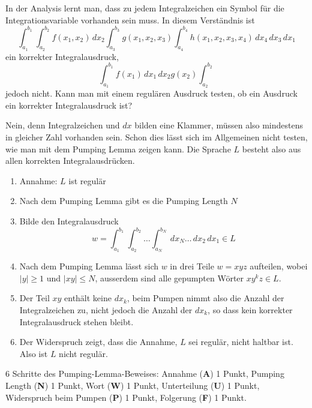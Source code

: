 In der Analysis lernt man, dass zu jedem Integralzeichen ein 
Symbol für die Integrationsvariable vorhanden sein muss.
In diesem Verständnis ist
\[
\int_{a_1}^{b_1}
\int_{a_2}^{b_2}
f(x_1,x_2)
\,dx_2
\int_{a_3}^{b_3}
g(x_1,x_2,x_3)
\int_{a_4}^{b_4}
h(x_1,x_2,x_3,x_4)
\,dx_4
\,dx_3
\,dx_1
\]
ein korrekter Integralausdruck,
\[
\int_{a_1}^{b_1}
f(x_1)\,dx_1\,dx_2 g(x_2)
\int_{a_2}^{b_2}
\]
jedoch nicht.
Kann man mit einem regulären Ausdruck testen, ob ein Ausdruck ein korrekter
Integralausdruck ist?

\begin{loesung}
Nein, denn Integralzeichen und $dx$ bilden eine Klammer, müssen also 
mindestens in gleicher Zahl vorhanden sein.
Schon dies lässt sich im Allgemeinen nicht testen, wie man mit dem 
Pumping Lemma zeigen kann.
Die Sprache $L$ besteht also aus allen korrekten Integralausdrücken.
\begin{enumerate}
\item
Annahme: $L$ ist regulär
\item
Nach dem Pumping Lemma gibt es die Pumping Length $N$
\item
Bilde den Integralausdruck
\[
w=
\int_{a_1}^{b_1}
\int_{a_2}^{b_2}
\dots
\int_{a_N}^{b_N}
\,dx_N
\dots
\,dx_2
\,dx_1
\in L
\]
\item
Nach dem Pumping Lemma lässt sich $w$ in drei Teile $w=xyz$ aufteilen, wobei
$|y|\ge 1$ und $|xy|\le N$, ausserdem sind alle gepumpten Wörter $xy^kz\in L$.
\item
Der Teil $xy$ enthält keine $dx_k$, beim Pumpen nimmt also die Anzahl
der Integralzeichen zu, nicht jedoch die Anzahl der $dx_k$, so dass
kein korrekter Integralausdruck stehen bleibt.
\item
Der Widerspruch zeigt, dass die Annahme, $L$ sei regulär, nicht haltbar ist.
Also ist $L$ nicht regulär.
\qedhere
\end{enumerate}
\end{loesung}

\begin{bewertung}
6 Schritte des Pumping-Lemma-Beweises:
Annahme ({\bf A}) 1 Punkt,
Pumping Length ({\bf N}) 1 Punkt,
Wort ({\bf W}) 1 Punkt,
Unterteilung ({\bf U}) 1 Punkt,
Widerspruch beim Pumpen ({\bf P}) 1 Punkt,
Folgerung ({\bf F}) 1 Punkt.
\end{bewertung}

